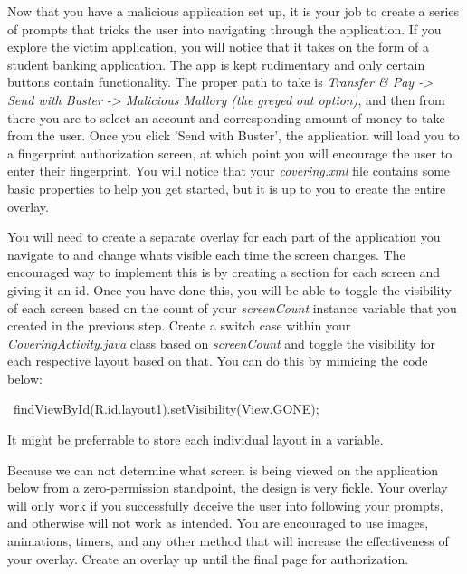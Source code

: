 \documentclass[letterpaper,12pt]{report}
\begin{document}
\bigskip

Now that you have a malicious application set up, it is your job to create a series of prompts that tricks the user into navigating through the application. If you explore the victim application, you will notice that it takes on the form of a student banking application. The app is kept rudimentary and only certain buttons contain functionality. The proper path to take is \emph{Transfer \& Pay -> Send with Buster -> Malicious Mallory (the greyed out option)}, and then from there you are to select an account and corresponding amount of money to take from the user. Once you click ’Send with Buster’, the application will load you to a fingerprint authorization screen, at which point you will encourage the user to enter their fingerprint. You will notice that your \emph{covering.xml} file contains some basic properties to help you get started, but it is up to you to create the entire overlay.

\bigskip

You will need to create a separate overlay for each part of the application you navigate to and change whats visible each time the screen changes. The encouraged way to implement this is by creating a section for each screen and giving it an id. Once you have done this, you will be able to toggle the visibility of each screen based on the count of your \emph{screenCount} instance variable that you created in the previous step. Create a switch case within your \emph{CoveringActivity.java} class based on \emph{screenCount} and toggle the visibility for each respective layout based on that. You can do this by mimicing the code below:

\bigskip
\begin{mdframed}[backgroundcolor=black!10,style=code,nobreak=true,align=center,userdefinedwidth=14cm]
\ findViewById(R.id.layout1).setVisibility(View.GONE);
\end{mdframed}
\bigskip

It might be preferrable to store each individual layout in a variable.

\bigskip

Because we can not determine what screen is being viewed on the application below from a zero-permission standpoint, the design is very fickle. Your overlay will only work if you successfully deceive the user into following your prompts, and otherwise will not work as intended. You are encouraged to use images, animations, timers, and any other method that will increase the effectiveness of your overlay. Create an overlay up until the final page for authorization.
\end{document}
